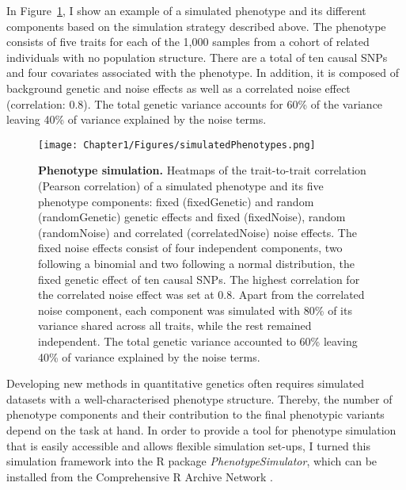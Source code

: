 In Figure~\ref{fig:simulation}, I show an example of a simulated phenotype and its different components based on the simulation strategy described above. The phenotype consists of five traits for each of the 1,000 samples from a cohort of related individuals with no population structure. There are a total of ten causal SNPs and four covariates associated with the phenotype. In addition, it is composed of background genetic and noise effects as well as a correlated noise effect (correlation: 0.8). The total genetic variance accounts for 60\% of the variance leaving 40\% of variance explained by the noise terms.

\begin{figure}[hbtp]
	\centering
	\texttt{[image: Chapter1/Figures/simulatedPhenotypes.png]}
	\caption{\textbf{Phenotype simulation.} Heatmaps of the trait-to-trait correlation (Pearson correlation) of a simulated phenotype and its five phenotype components: fixed (fixedGenetic) and random (randomGenetic) genetic effects and fixed (fixedNoise), random (randomNoise) and correlated (correlatedNoise) noise effects. The fixed noise effects consist of four independent components, two following a binomial and two following a normal distribution, the fixed genetic effect of ten causal SNPs. The highest correlation for the correlated noise effect was set at 0.8. Apart from the correlated noise component, each component was simulated with 80\% of its variance shared across all traits, while the rest remained independent. The total genetic variance accounted to 60\% leaving 40\% of variance explained by the noise terms.}
	\label{fig:simulation}
\end{figure}


Developing new methods in quantitative genetics often requires simulated datasets with a well-characterised phenotype structure. Thereby, the number of phenotype components and their contribution to the final phenotypic variants depend on the task at hand. In order to provide a tool for phenotype simulation that is easily accessible and allows flexible simulation set-ups, I turned this simulation framework into the R package \textit{PhenotypeSimulator}, which can be installed from the Comprehensive R Archive Network  \citep{Meyer2017} .

